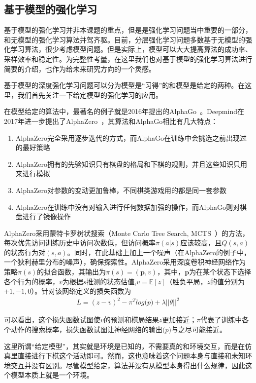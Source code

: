     \subsection{基于模型的强化学习}
    基于模型的强化学习并非本课题的重点，但是是强化学习问题当中重要的一部分，和无模型的强化学习算法并驾齐驱。目前，分层强化学习问题多数基于无模型的强化学习算法，很少考虑模型问题。但是实际上，模型可以大大提高算法的成功率、采样效率和稳定性。为完整性考量，在这里我们也对基于模型的强化学习算法进行简要的介绍，也作为给未来研究方向的一个灵感。
    
    基于模型的深度强化学习问题可以分为模型是``习得''的和模型是给定的两种。在这里，我们首先关注一下给定模型的强化学习的应用。
      \par 在模型给定的算法中，最著名的例子就是2016年提出的AlphaGo~\cite{AlphaGo}。Deepmind在2017年进一步提出了AlphaZero~\cite{AlphaZero}，其算法和AlphaGo相比有几大特点：
      \begin{enumerate}
        \item AlphaZero完全采用逐步迭代的方式，而AlphaGo在训练中会挑选之前出现过的最好策略
        \item AlphaZero拥有的先验知识只有棋盘的格局和下棋的规则，并且这些知识只用来进行模拟
        \item AlphaZero对参数的变动更加鲁棒，不同棋类游戏用的都是同一套参数
        \item AlphaZero在训练中没有对输入进行任何数据加强的操作，而AlphaGo则对棋盘进行了镜像操作
      \end{enumerate}
      \par AlphaZero采用蒙特卡罗树状搜索（Monte Carlo Tree Search, MCTS~\cite{Sutton_book}）的方法，每次优先访问训练历史中访问次数低，但访问概率$\pi(a|s)$应该较高，且$Q(s, a)$的状态行为对$(s, a)$。同时，在此基础上加上一个噪声（在AlphaZero的例子中，一个狄利赫里分布的噪声），确保探索性。AlphaZero采用深度卷积神经网络作为策略$\pi(s)$的拟合函数，其输出为$\pi(s) = (\mathbf{p}, v)$，其中，$\mathbf{p}$为在某个状态下选择各个行为的概率，$v$为根据$s$推测的状态估值,$v = \mathbb{E}[z]$（胜负平局，$z$的值分别为$+1, -1, 0$）。针对该网络定义的损失函数为
      \begin{align}
        L = (z-v)^2 - \pi^T log \mathbf(p) + \lambda ||\theta||^2
      \end{align}
      \par 可以看出，这个损失函数试图使$v$的预测和棋局结果$z$更加接近；$\pi$代表了训练中各个动作的搜索概率，损失函数试图让神经网络的输出$\mathbf(p)$与之尽可能接近。
      \par 这里所谓“给定模型”，其实就是环境是已知的，不需要真的和环境交互，而是在仿真里直接进行下棋这个活动即可。然而，这也意味着这个问题本身与直接和未知环境交互并没有区别。尽管模型给定，算法并没有从模型本身得出什么规律，因此这个模型本质上就是一个环境。\par
